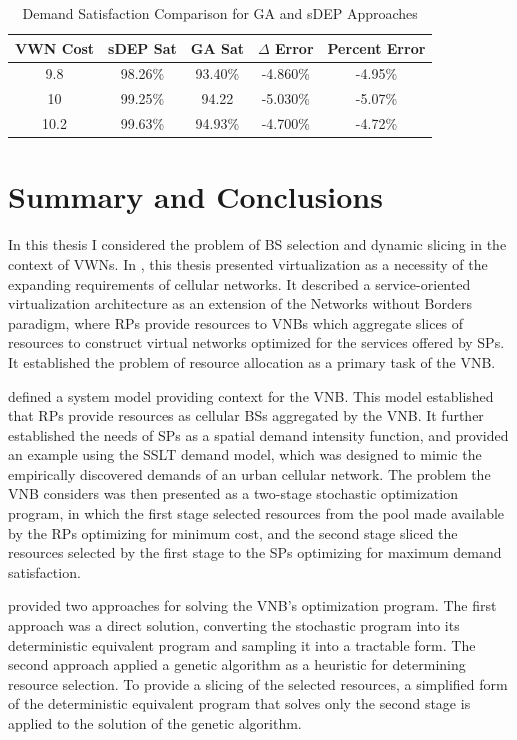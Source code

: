 \documentclass[12pt,dvipsnames]{report}
\begin{document}
\begin{table}[htp]
	\centering
	\caption[Demand Satisfaction Comparison for Case II GA and sDEP Approaches]{Demand Satisfaction Comparison for GA and sDEP Approaches}
	\begin{tabular}{|c|c|c|c|c|}
		\hline
		\textbf{VWN Cost} & \textbf{sDEP Sat} & \textbf{GA Sat} & \textbf{$\Delta$ Error} & \textbf{Percent Error} \\
		\hline
		9.8 & 98.26\% & 93.40\% & -4.860\% & -4.95\% \\
		\hline
		10 & 99.25\% & 94.22 & -5.030\% & -5.07\% \\
		\hline
		10.2 & 99.63\% & 94.93\% & -4.700\% & -4.72\% \\
		\hline
	\end{tabular}
	\label{tab:CaseII_sDEPGASatError}
\end{table}

\pagebreak
\chapter{Summary and Conclusions} \label{ch:conc}

In this thesis I considered the problem of BS selection and dynamic slicing in the context of VWNs.  In , this thesis presented virtualization as a necessity of the expanding requirements of cellular networks.  It described a service-oriented virtualization architecture as an extension of the Networks without Borders paradigm, where RPs provide resources to VNBs which aggregate slices of resources to construct virtual networks optimized for the services offered by SPs.  It established the problem of resource allocation as a primary task of the VNB.

 defined a system model providing context for the VNB.  This model established that RPs provide resources as cellular BSs aggregated by the VNB.  It further established the needs of SPs as a spatial demand intensity function, and provided an example using the SSLT demand model, which was designed to mimic the empirically discovered demands of an urban cellular network.  The problem the VNB considers was then presented as a two-stage stochastic optimization program, in which the first stage selected resources from the pool made available by the RPs optimizing for minimum cost, and the second stage sliced the resources selected by the first stage to the SPs optimizing for maximum demand satisfaction.

 provided two approaches for solving the VNB's optimization program.  The first approach was a direct solution, converting the stochastic program into its deterministic equivalent program and sampling it into a tractable form.  The second approach applied a genetic algorithm as a heuristic for determining resource selection.  To provide a slicing of the selected resources, a simplified form of the deterministic equivalent program that solves only the second stage is applied to the solution of the genetic algorithm. 
\end{document}

